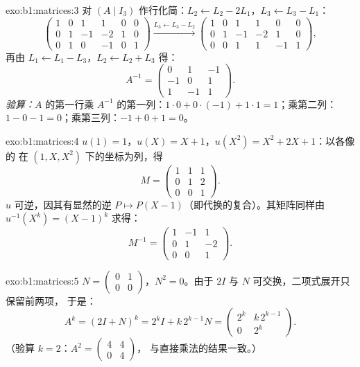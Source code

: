 \begin{solution}{exo:b1:matrices:3}
对 $(A \mid I_3)$ 作行化简：$L_2 \leftarrow L_2 - 2L_1$，$L_3
\leftarrow L_3 - L_1$：
\[
\begin{pmatrix}
1 & 0 & 1 & 1 & 0 & 0\\
0 & 1 & -1 & -2 & 1 & 0\\
0 & 1 & 0 & -1 & 0 & 1
\end{pmatrix}
\xrightarrow{L_3 \leftarrow L_3 - L_2}
\begin{pmatrix}
1 & 0 & 1 & 1 & 0 & 0\\
0 & 1 & -1 & -2 & 1 & 0\\
0 & 0 & 1 & 1 & -1 & 1
\end{pmatrix},
\]
再由 $L_1 \leftarrow L_1 - L_3$，$L_2 \leftarrow L_2 + L_3$ 得：
\[
A^{-1} = \begin{pmatrix}
0 & 1 & -1\\
-1 & 0 & 1\\
1 & -1 & 1
\end{pmatrix}.
\]
\emph{验算：}$A$ 的第一行乘 $A^{-1}$ 的第一列：$1
\cdot 0 + 0\cdot(-1) + 1\cdot 1 = 1$；乘第二列：$1 - 0 -
1 = 0$；乘第三列：$-1 + 0 + 1 = 0$。
\end{solution}

\begin{solution}{exo:b1:matrices:4}
$u(1) = 1$，$u(X) = X + 1$，$u(X^2) = X^2 + 2X + 1$：以各像的
在 $(1, X, X^2)$ 下的坐标为列，得
\[
M = \begin{pmatrix}
1 & 1 & 1\\
0 & 1 & 2\\
0 & 0 & 1
\end{pmatrix}.
\]
$u$ 可逆，因其有显然的逆 $P \mapsto P(X
- 1)$（即代换的复合）。其矩阵同样由
$u^{-1}(X^k) = (X-1)^k$ 求得：
\[
M^{-1} = \begin{pmatrix}
1 & -1 & 1\\
0 & 1 & -2\\
0 & 0 & 1
\end{pmatrix}.
\]
\end{solution}

\begin{solution}{exo:b1:matrices:5}
$N = \begin{pmatrix} 0 & 1\\ 0 & 0\end{pmatrix}$，$N^2 = 0$。由于
$2I$ 与 $N$ 可交换，二项式展开只保留前两项，
于是：
\[
A^k = (2I + N)^k = 2^k I + k\,2^{k-1} N
= \begin{pmatrix} 2^k & k\,2^{k-1}\\ 0 & 2^k\end{pmatrix}.
\]
（验算 $k = 2$：$A^2 = \begin{pmatrix}4 & 4\\ 0 & 4\end{pmatrix}$，
与直接乘法的结果一致。）
\end{solution}

